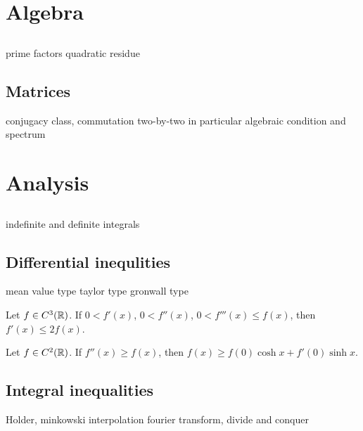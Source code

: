 \documentclass[a4paper]{report}
\begin{document}
\chapter{Algebra}
\section{}
prime factors
quadratic residue
\section{Matrices}
conjugacy class, commutation
	two-by-two in particular
algebraic condition and spectrum
\section{}

\chapter{Analysis}
\section{}
indefinite and definite integrals
\section{Differential inequlities}
mean value type
taylor type
gronwall type
\begin{prb}
\begin{parts}
\item
Let $f\in C^3(\mathbb{R})$.
If $0<f'(x)$, $0<f''(x)$, $0<f'''(x)\le f(x)$, then $f'(x)\le2f(x)$.
\item
Let $f\in C^2(\mathbb{R})$.
If $f''(x)\ge f(x)$, then $f(x)\ge f(0)\cosh x+f'(0)\sinh x$.
\end{parts}
\end{prb}
\section{Integral inequalities}
Holder, minkowski
interpolation
fourier transform, divide and conquer
\end{document}
